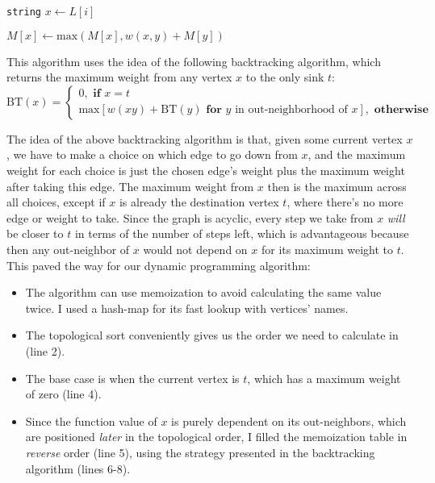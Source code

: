 \documentclass{article}
\begin{document}
\begin{enumerate}
\begin{center}
\begin{minipage}{\linewidth}
\begin{algorithm}[H]
          {
          \texttt{string} $x \gets L[i]$

          {
            $M[x] \gets \text{max}(M[x], w(x, y) + M[y])$
            }
          }

        \end{algorithm}
      \end{minipage}
    \end{center}

    This algorithm uses the idea of the following backtracking algorithm, which returns the maximum weight from any vertex $x$ to the only sink $t$:
    $$
      \text{BT}(x) = \begin{cases}
        0,\textbf{ if }x = t \\
        \text{max}[w(xy) + \text{BT}(y)\textbf{ for }y\text{ in out-neighborhood of }x],\textbf{ otherwise}
      \end{cases}
    $$

    The idea of the above backtracking algorithm is that, given some current vertex $x$, we have to make a choice on which edge to go down from $x$, and the maximum weight for each choice is just the chosen edge's weight plus the maximum weight after taking this edge. The maximum weight from $x$ then is the maximum across all choices, except if $x$ is already the destination vertex $t$, where there's no more edge or weight to take. Since the graph is acyclic, every step we take from $x$ \textit{will} be closer to $t$ in terms of the number of steps left, which is advantageous because then any out-neighbor of $x$ would not depend on $x$ for its maximum weight to $t$. This paved the way for our dynamic programming algorithm:
    \begin{itemize}
      \item The algorithm can use memoization to avoid calculating the same value twice. I used a hash-map for its fast lookup with vertices' names.
      \item The topological sort conveniently gives us the order we need to calculate in (line 2).
      \item The base case is when the current vertex is $t$, which has a maximum weight of zero (line 4).
      \item Since the function value of $x$ is purely dependent on its out-neighbors, which are positioned \textit{later} in the topological order, I filled the memoization table in \textit{reverse} order (line 5), using the strategy presented in the backtracking algorithm (lines 6-8).
    \end{itemize}


\end{enumerate}
\end{document}
